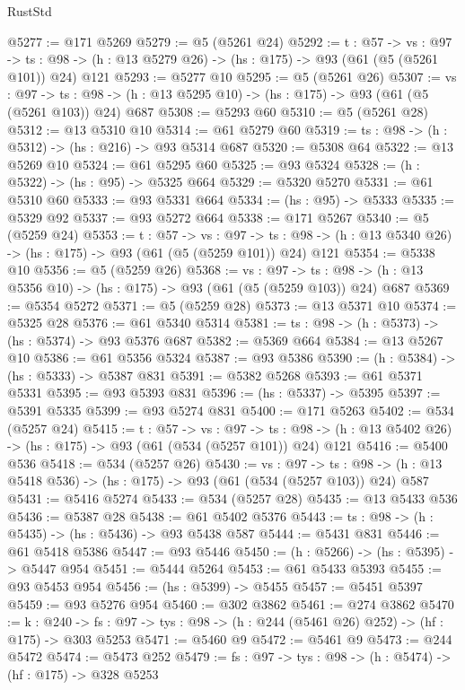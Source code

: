 \begin{lexlean}{RustStd}
\begin{coremodule}
@5277 := @171 @5269
@5279 := @5 (@5261 @24)
@5292 := {t : @57} ->
  {vs : @97} ->
  {ts : @98} -> (h : @13 @5279 @26) -> (hs : @175) -> @93 (@61 (@5 (@5261 @101)) @24) @121
@5293 := @5277 @10
@5295 := @5 (@5261 @26)
@5307 := {vs : @97} ->
  {ts : @98} -> (h : @13 @5295 @10) -> (hs : @175) -> @93 (@61 (@5 (@5261 @103)) @24) @687
@5308 := @5293 @60
@5310 := @5 (@5261 @28)
@5312 := @13 @5310 @10
@5314 := @61 @5279 @60
@5319 := {ts : @98} -> (h : @5312) -> (hs : @216) -> @93 @5314 @687
@5320 := @5308 @64
@5322 := @13 @5269 @10
@5324 := @61 @5295 @60
@5325 := @93 @5324
@5328 := (h : @5322) -> (hs : @95) -> @5325 @664
@5329 := @5320 @5270
@5331 := @61 @5310 @60
@5333 := @93 @5331 @664
@5334 := (hs : @95) -> @5333
@5335 := @5329 @92
@5337 := @93 @5272 @664
@5338 := @171 @5267
@5340 := @5 (@5259 @24)
@5353 := {t : @57} ->
  {vs : @97} ->
  {ts : @98} -> (h : @13 @5340 @26) -> (hs : @175) -> @93 (@61 (@5 (@5259 @101)) @24) @121
@5354 := @5338 @10
@5356 := @5 (@5259 @26)
@5368 := {vs : @97} ->
  {ts : @98} -> (h : @13 @5356 @10) -> (hs : @175) -> @93 (@61 (@5 (@5259 @103)) @24) @687
@5369 := @5354 @5272
@5371 := @5 (@5259 @28)
@5373 := @13 @5371 @10
@5374 := @5325 @28
@5376 := @61 @5340 @5314
@5381 := {ts : @98} -> (h : @5373) -> (hs : @5374) -> @93 @5376 @687
@5382 := @5369 @664
@5384 := @13 @5267 @10
@5386 := @61 @5356 @5324
@5387 := @93 @5386
@5390 := (h : @5384) -> (hs : @5333) -> @5387 @831
@5391 := @5382 @5268
@5393 := @61 @5371 @5331
@5395 := @93 @5393 @831
@5396 := (hs : @5337) -> @5395
@5397 := @5391 @5335
@5399 := @93 @5274 @831
@5400 := @171 @5263
@5402 := @534 (@5257 @24)
@5415 := {t : @57} ->
  {vs : @97} ->
  {ts : @98} -> (h : @13 @5402 @26) -> (hs : @175) -> @93 (@61 (@534 (@5257 @101)) @24) @121
@5416 := @5400 @536
@5418 := @534 (@5257 @26)
@5430 := {vs : @97} ->
  {ts : @98} -> (h : @13 @5418 @536) -> (hs : @175) -> @93 (@61 (@534 (@5257 @103)) @24) @587
@5431 := @5416 @5274
@5433 := @534 (@5257 @28)
@5435 := @13 @5433 @536
@5436 := @5387 @28
@5438 := @61 @5402 @5376
@5443 := {ts : @98} -> (h : @5435) -> (hs : @5436) -> @93 @5438 @587
@5444 := @5431 @831
@5446 := @61 @5418 @5386
@5447 := @93 @5446
@5450 := (h : @5266) -> (hs : @5395) -> @5447 @954
@5451 := @5444 @5264
@5453 := @61 @5433 @5393
@5455 := @93 @5453 @954
@5456 := (hs : @5399) -> @5455
@5457 := @5451 @5397
@5459 := @93 @5276 @954
@5460 := @302 @3862
@5461 := @274 @3862
@5470 := {k : @240} ->
  {fs : @97} -> {tys : @98} -> (h : @244 (@5461 @26) @252) -> (hf : @175) -> @303 @5253
@5471 := @5460 @9
@5472 := @5461 @9
@5473 := @244 @5472
@5474 := @5473 @252
@5479 := {fs : @97} -> {tys : @98} -> (h : @5474) -> (hf : @175) -> @328 @5253

\end{coremodule}
\end{lexlean}
